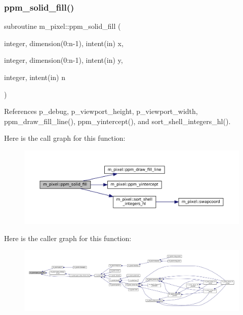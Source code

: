 \subsubsection{\texorpdfstring{ppm\+\_\+solid\+\_\+fill()}{ppm\_solid\_fill()}}
{\footnotesize\ttfamily subroutine m\+\_\+pixel\+::ppm\+\_\+solid\+\_\+fill (\begin{DoxyParamCaption}\item[{integer, dimension(0\+:n-\/1), intent(in)}]{x,  }\item[{integer, dimension(0\+:n-\/1), intent(in)}]{y,  }\item[{integer, intent(in)}]{n }\end{DoxyParamCaption})\hspace{0.3cm}{\ttfamily [private]}}



References p\+\_\+debug, p\+\_\+viewport\+\_\+height, p\+\_\+viewport\+\_\+width, ppm\+\_\+draw\+\_\+fill\+\_\+line(), ppm\+\_\+yintercept(), and sort\+\_\+shell\+\_\+integers\+\_\+hl().

Here is the call graph for this function\+:
\nopagebreak
\begin{figure}[H]
\begin{center}
\leavevmode
\includegraphics[width=350pt]{namespacem__pixel_aedaf33a27e9899da22c2497aff2af903_cgraph}
\end{center}
\end{figure}
Here is the caller graph for this function\+:
\nopagebreak
\begin{figure}[H]
\begin{center}
\leavevmode
\includegraphics[width=350pt]{namespacem__pixel_aedaf33a27e9899da22c2497aff2af903_icgraph}
\end{center}
\end{figure}
\mbox{\label{namespacem__pixel_a4924b3a5033acb74a4f4df60a4ba21eb}} 

